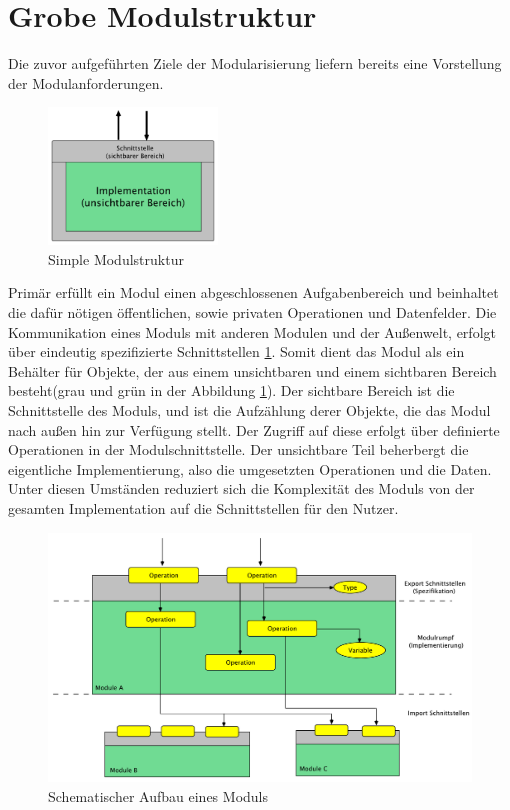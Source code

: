   \section{Grobe Modulstruktur}
      Die zuvor aufgeführten Ziele der Modularisierung liefern bereits eine Vorstellung der Modulanforderungen.
        \begin{figure}[h!] 
        \centering
        \includegraphics[width=0.4\textwidth]{material/images/simple-module.pdf}
        \caption{Simple Modulstruktur \cite{modulMitJava9}}
        \label{fig:simple-module}
      \end{figure}
    Primär erfüllt ein Modul einen abgeschlossenen Aufgabenbereich und beinhaltet die dafür nötigen öffentlichen, sowie privaten Operationen und Datenfelder. Die Kommunikation eines Moduls mit anderen Modulen und der Außenwelt, erfolgt über eindeutig spezifizierte Schnittstellen \ref{fig:simple-module}.\newline
    Somit dient das Modul als ein Behälter für Objekte, der aus einem unsichtbaren und einem sichtbaren Bereich besteht(grau und grün in der Abbildung \ref{fig:simple-module}). Der sichtbare Bereich ist die Schnittstelle des Moduls, und ist die Aufzählung derer Objekte, die das Modul nach außen hin zur Verfügung stellt. Der Zugriff auf diese erfolgt über definierte Operationen in der Modulschnittstelle. Der unsichtbare Teil beherbergt die eigentliche Implementierung, also die umgesetzten Operationen und die Daten. Unter diesen Umständen reduziert sich die Komplexität des Moduls von der gesamten Implementation auf die Schnittstellen für den Nutzer. \cite{javaMod9,java9modRevealed,explorJava9,modulMitJav9}

      \begin{figure}[h!]
        \centering
        \includegraphics[width=\textwidth]{material/images/Module-workflow.pdf}
        \caption{Schematischer Aufbau eines Moduls \cite{modulMitJava9}}
        \label{fig:mw}
      \end{figure} 

